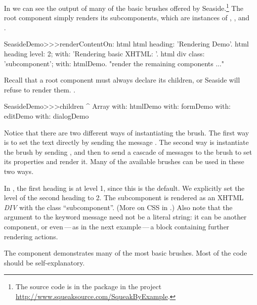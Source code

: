 \documentclass[a4paper,10pt,twoside]{book}
\begin{document}
In  we can see the output of many of the basic brushes offered by Seaside.\footnote{The source code is in the package  in the project \url{http://www.squeaksource.com/SqueakByExample}.}
The root component  simply renders its subcomponents, which are instances of , ,  and .

\begin{method}[renderdemo]{}
SeasideDemo>>>renderContentOn: html
	html heading: 'Rendering Demo'.
	html heading
		level: 2;
		with: 'Rendering basic XHTML: '.
	html div
		class: 'subcomponent';
		with: htmlDemo.
	"render the remaining components ..."
\end{method}

\noindent
Recall that a root component must always declare its children, or Seaside will refuse to render them.
.
\begin{code}{}
SeasideDemo>>>children
	^ Array with: htmlDemo with: formDemo with: editDemo with: dialogDemo
\end{code}

Notice that there are two different ways of instantiating the  brush.
The first way is to set the text directly by sending the message .
The second way is instantiate the brush by sending , and then to send a cascade of messages to the brush to set its properties and render it.
Many of the available brushes can be used in these two ways.



In , the first heading is at level 1, since this is the default.
We explicitly set the level of the second heading to 2.
The subcomponent is rendered as an XHTML \emph{DIV}  with the  class ``subcomponent''.
(More on CSS in .)
Also note that the argument to the  keyword message need not be a literal string: it can be another component, or even\,---\,as in the next example\,---\,a block containing further rendering actions.

The  component demonstrates many of the most basic brushes.
Most of the code should be self-explanatory.
\end{document}
